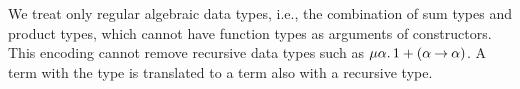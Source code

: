 We treat only regular algebraic data types, i.e., the combination of sum
types and product types, which cannot have function types as arguments
of constructors.  This encoding cannot remove recursive data types such
as $\mu{\alpha}.\, {1 + ({\alpha}\mathbin{\rightarrow}{\alpha})}$.  A term with the
type is translated to a term also with a recursive type.

%
%
%
%
